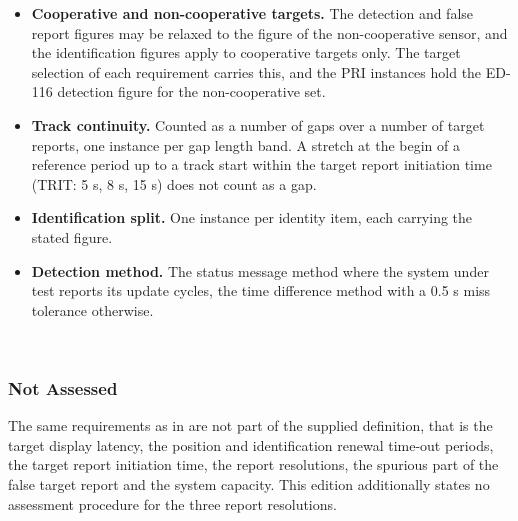 \begin{itemize}
\item \textbf{Cooperative and non-cooperative targets.} The detection and false report figures may be relaxed to the figure of the non-cooperative sensor, and the identification figures apply to cooperative targets only. The target selection of each requirement carries this, and the PRI instances hold the ED-116 detection figure for the non-cooperative set.
\item \textbf{Track continuity.} Counted as a number of gaps over a number of target reports, one instance per gap length band. A stretch at the begin of a reference period up to a track start within the target report initiation time (TRIT: 5 s, 8 s, 15 s) does not count as a gap.
\item \textbf{Identification split.} One instance per identity item, each carrying the stated figure.
\item \textbf{Detection method.} The status message method where the system under test reports its update cycles, the time difference method with a 0.5 s miss tolerance otherwise.
\end{itemize}
\ \\

\subsubsection{Not Assessed}

The same requirements as in  are not part of the supplied definition, that is the target display latency, the position and identification renewal time-out periods, the target report initiation time, the report resolutions, the spurious part of the false target report and the system capacity. This edition additionally states no assessment procedure for the three report resolutions.
